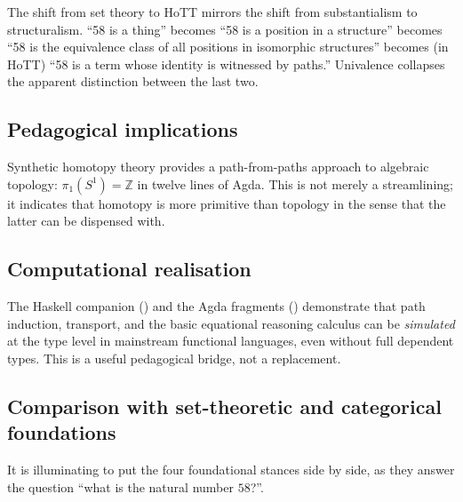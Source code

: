 \documentclass[12pt]{article}
\theoremstyle{definition}
\theoremstyle{remark}
\newcommand{\Z}{\mathbb{Z}}
\newcommand{\Sone}{S^1}
\begin{document}
The shift from set theory to HoTT mirrors the shift from substantialism to
structuralism. ``58 is a thing'' becomes ``58 is a position in a
structure'' becomes ``58 is the equivalence class of all positions in
isomorphic structures'' becomes (in HoTT) ``58 is a term whose identity is
witnessed by paths.'' Univalence collapses the apparent distinction
between the last two.

\subsection{Pedagogical implications}

Synthetic homotopy theory provides a path-from-paths approach to algebraic
topology: $\pi_1(\Sone{}) = \Z$ in twelve lines of Agda. This is not merely a
streamlining; it indicates that homotopy is more primitive than topology
in the sense that the latter can be dispensed with.

\subsection{Computational realisation}

The Haskell companion () and the Agda fragments
() demonstrate that path induction, transport, and
the basic equational reasoning calculus can be \emph{simulated} at the
type level in mainstream functional languages, even without full
dependent types. This is a useful pedagogical bridge, not a replacement.

\subsection{Comparison with set-theoretic and categorical foundations}

It is illuminating to put the four foundational stances side by side, as
they answer the question ``what is the natural number $58$?''.
\end{document}
